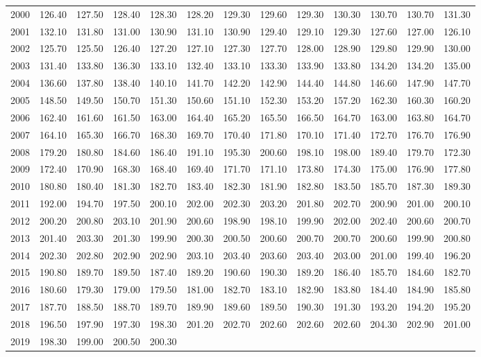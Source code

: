 \begin{longtable}{rrrrrrrrrrrrr}
  2000 & 126.40 & 127.50 & 128.40 & 128.30 & 128.20 & 129.30 & 129.60 & 129.30 & 130.30 & 130.70 & 130.70 & 131.30 \\ 
  2001 & 132.10 & 131.80 & 131.00 & 130.90 & 131.10 & 130.90 & 129.40 & 129.10 & 129.30 & 127.60 & 127.00 & 126.10 \\ 
  2002 & 125.70 & 125.50 & 126.40 & 127.20 & 127.10 & 127.30 & 127.70 & 128.00 & 128.90 & 129.80 & 129.90 & 130.00 \\ 
  2003 & 131.40 & 133.80 & 136.30 & 133.10 & 132.40 & 133.10 & 133.30 & 133.90 & 133.80 & 134.20 & 134.20 & 135.00 \\ 
  2004 & 136.60 & 137.80 & 138.40 & 140.10 & 141.70 & 142.20 & 142.90 & 144.40 & 144.80 & 146.60 & 147.90 & 147.70 \\ 
  2005 & 148.50 & 149.50 & 150.70 & 151.30 & 150.60 & 151.10 & 152.30 & 153.20 & 157.20 & 162.30 & 160.30 & 160.20 \\ 
  2006 & 162.40 & 161.60 & 161.50 & 163.00 & 164.40 & 165.20 & 165.50 & 166.50 & 164.70 & 163.00 & 163.80 & 164.70 \\ 
  2007 & 164.10 & 165.30 & 166.70 & 168.30 & 169.70 & 170.40 & 171.80 & 170.10 & 171.40 & 172.70 & 176.70 & 176.90 \\ 
  2008 & 179.20 & 180.80 & 184.60 & 186.40 & 191.10 & 195.30 & 200.60 & 198.10 & 198.00 & 189.40 & 179.70 & 172.30 \\ 
  2009 & 172.40 & 170.90 & 168.30 & 168.40 & 169.40 & 171.70 & 171.10 & 173.80 & 174.30 & 175.00 & 176.90 & 177.80 \\ 
  2010 & 180.80 & 180.40 & 181.30 & 182.70 & 183.40 & 182.30 & 181.90 & 182.80 & 183.50 & 185.70 & 187.30 & 189.30 \\ 
  2011 & 192.00 & 194.70 & 197.50 & 200.10 & 202.00 & 202.30 & 203.20 & 201.80 & 202.70 & 200.90 & 201.00 & 200.10 \\ 
  2012 & 200.20 & 200.80 & 203.10 & 201.90 & 200.60 & 198.90 & 198.10 & 199.90 & 202.00 & 202.40 & 200.60 & 200.70 \\ 
  2013 & 201.40 & 203.30 & 201.30 & 199.90 & 200.30 & 200.50 & 200.60 & 200.70 & 200.70 & 200.60 & 199.90 & 200.80 \\ 
  2014 & 202.30 & 202.80 & 202.90 & 202.90 & 203.10 & 203.40 & 203.60 & 203.40 & 203.00 & 201.00 & 199.40 & 196.20 \\ 
  2015 & 190.80 & 189.70 & 189.50 & 187.40 & 189.20 & 190.60 & 190.30 & 189.20 & 186.40 & 185.70 & 184.60 & 182.70 \\ 
  2016 & 180.60 & 179.30 & 179.00 & 179.50 & 181.00 & 182.70 & 183.10 & 182.90 & 183.80 & 184.40 & 184.90 & 185.80 \\ 
  2017 & 187.70 & 188.50 & 188.70 & 189.70 & 189.90 & 189.60 & 189.50 & 190.30 & 191.30 & 193.20 & 194.20 & 195.20 \\ 
  2018 & 196.50 & 197.90 & 197.30 & 198.30 & 201.20 & 202.70 & 202.60 & 202.60 & 202.60 & 204.30 & 202.90 & 201.00 \\ 
  2019 & 198.30 & 199.00 & 200.50 & 200.30 &  &  &  &  &  &  &  &  \\ 
   \hline
\hline
\end{longtable}
